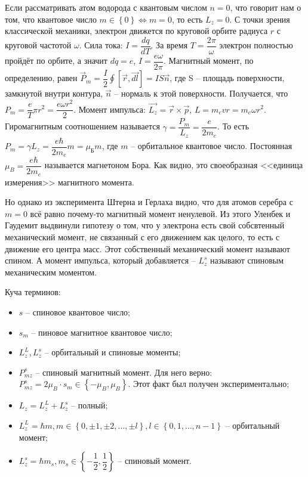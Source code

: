Если рассматривать атом водорода с квантовым числом $n=0$, что говорит нам о том, что квантовое
число $m \in \left\{ 0 \right\} \Leftrightarrow m=0$, то есть $L_z = 0$. С точки зрения
классической механики, электрон движется
по круговой орбите радиуса $r$ с круговой частотой $\omega$. Сила тока: $I = \dfrac{dq}{dT}$.
За время $T = \dfrac{2\pi}{\omega}$ электрон полностью пройдёт по орбите, а значит $dq = e$, 
$I = \dfrac{e \omega}{2\pi}$. Магнитный момент, по определению, равен
$\vec{P}_m = \dfrac{I}{2} \oint [\vec{r}, \vec{dl}] = I S \vec{n}$, где S -- площадь
поверхности, замкнутой внутри контура, $\vec{n}$ -- нормаль к этой поверхности.
Получается, что $P_m = \dfrac{e}{T} \pi r^2 = \dfrac{e \omega r^2}{2}$. Момент импульса:
$\vec{L_z} = \vec{r} \times \vec{p}$,
$L = m_e vr = m_e \omega r^2$.
Гиромагнитным соотношением называется $\gamma = \dfrac{P_m}{L_z} = \dfrac{e}{2m_e}$. 
То есть $P_m = \gamma L_z = \dfrac{e \hbar}{2 m_e} m = \mu_\text{Б} m$, где $m$ -- орбитальное квантовое число.
Постоянная $\mu_B = \dfrac{e \hbar}{2 m_e}$ называется магнетоном Бора. Как видно, это 
своеобразная <<единица измерения>> магнитного момента. 

Но однако из эксперимента Штерна и Герлаха видно, что для атомов серебра с $m=0$ всё равно
почему-то магнитный момент ненулевой. Из этого Уленбек и Гаудемит выдвинули гипотезу о том, 
что у электрона есть свой собсвтенный механический момент, не связанный с его движением как целого,
то есть с движение его центра масс. Этот собственный механический момент называют спином.
А момент импульса, который добавляется -- $L_z^s$ называют спиновым механическим моментом.

Куча терминов:
\begin{itemize}
  \item $s$ -- спиновое квантовое число;
  \item $s_m$ -- пиновое магнитное квантовое число;
  \item $L_z^L, L_z^s$ -- орбитальный и спиновые моменты;
  \item $P_{mz}^s$ -- спиновый магнитный момент.
    Для него верно: $P_{mz}^s = 2 \mu_B \cdot s_m \in \left\{ -\mu_B, \mu_B \right\}$.
    Этот факт был получен экспериментально;
  \item $L_z = L_z^L + L_z^s$ -- полный;
  \item $L_z^L = \hbar m, m \in \left\{ 0, \pm 1, \pm 2, \dots, \pm l \right\}, l \in \left\{ 0, 1, \dots, n-1 \right\}$ -- орбитальный момент;
  \item $L_z^s = \hbar m_s, m_s \in \left\{ - \dfrac{1}{2}, \dfrac{1}{2} \right\}$ -- спиновый момент.
\end{itemize}
